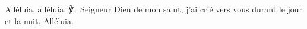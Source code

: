 Alléluia, alléluia.
℣.~Seigneur Dieu de mon salut, j’ai crié vers vous durant le jour et la nuit. Alléluia.

